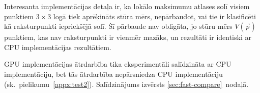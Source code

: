 Interesanta implementācijas detaļa ir, ka lokālo maksimumu atlases solī
visiem punktiem $3 \times 3$ logā tiek aprēķināts stūra mērs,
nepārbaudot, vai tie ir klasificēti kā raksturpunkti iepriekšējā solī.
Šī pārbaude nav obligāta, jo stūru mērs $V(\vec{p})$ punktiem,
kas nav raksturpunkti ir vienmēr mazāks, un rezultāti ir identiski ar
CPU implementācijas rezultātiem.

GPU implementācijas ātrdarbība tika eksperimentāli salīdzināta ar CPU
implementāciju, bet tās ātrdarbība nepārsniedza CPU implementāciju
(sk.~pielikumu~\ref{appx:test2}).
Salīdzinājums izvērsts \ref{sec:fast-compare}~nodaļā.
